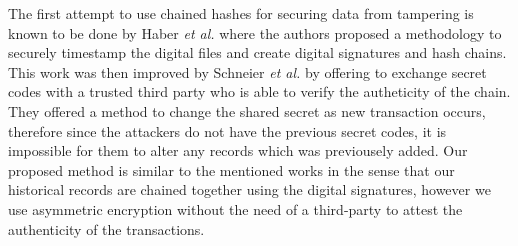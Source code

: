 The first attempt to use chained hashes for securing data from tampering is known to be done by Haber {\it et al.} \cite{haber1991how} where the authors proposed a methodology to securely timestamp the digital files and create digital signatures and hash chains. This work was then improved by Schneier {\it et al.} \cite{schneier1998cryptoraphic} \cite{schneier1999minimizing} \cite{schneier1999secure} by offering to exchange secret codes with a trusted third party who is able to verify the autheticity of the chain. They offered a method to change the shared secret as new transaction occurs, therefore since the attackers do not have the previous secret codes, it is impossible for them to alter any records which was previousely added. Our proposed method is similar to the mentioned works in the sense that our historical records are chained together using the digital signatures, however we use asymmetric encryption without the need of a third-party to attest the authenticity of the transactions.
